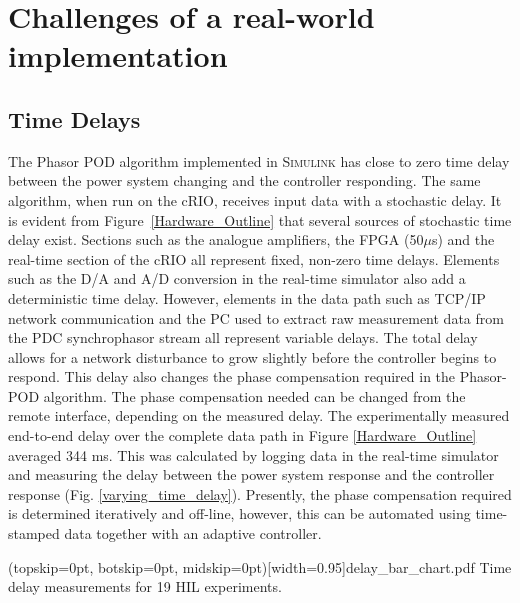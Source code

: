\documentclass{ieeeaccess}
\begin{document}
\section{Challenges of a real-world implementation}\label{Challenges}

\subsection{Time Delays}

The Phasor POD algorithm implemented in \textsc{Simulink} has close to zero time delay between the power system changing and the controller responding. The same algorithm, when run on the cRIO, receives input data with a stochastic delay. It is evident from Figure~\ref{Hardware_Outline} that several sources of stochastic time delay exist. Sections such as the analogue amplifiers, the FPGA (50$\mu$s) and the real-time section of the cRIO all represent fixed, non-zero time delays. Elements such as the D/A and A/D conversion in the real-time simulator also add a deterministic time delay. However, elements in the data path such as TCP/IP network communication and the PC used to extract raw measurement data from the PDC synchrophasor stream all represent variable delays. The total delay allows for a network disturbance to grow slightly before the controller begins to respond. This delay also changes the phase compensation required in the Phasor-POD algorithm. The phase compensation needed can be changed from the remote interface, depending on the measured delay. The experimentally measured end-to-end delay over the complete data path in Figure \ref{Hardware_Outline} averaged 344 ms. This was calculated by logging data in the real-time simulator and measuring the delay between the power system response and the controller response (Fig. \ref{varying_time_delay}). Presently, the phase compensation required is determined iteratively and off-line, however, this can be automated using time-stamped data together with an adaptive controller.

\Figure[tbp!](topskip=0pt, botskip=0pt, midskip=0pt)[width=0.95\columnwidth]{delay_bar_chart.pdf}
{Time delay measurements for 19 HIL experiments.\label{varying_time_delay}}
\end{document}
